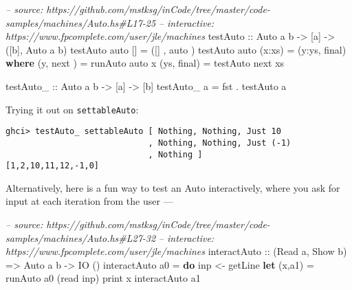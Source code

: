 \documentclass[]{article}
\newenvironment{Shaded}{\begin{snugshade}}{\end{snugshade}}
\newcommand{\CommentTok}[1]{\textcolor[rgb]{0.56,0.35,0.01}{\textit{#1}}}
\newcommand{\DataTypeTok}[1]{\textcolor[rgb]{0.13,0.29,0.53}{#1}}
\newcommand{\FunctionTok}[1]{\textcolor[rgb]{0.00,0.00,0.00}{#1}}
\newcommand{\KeywordTok}[1]{\textcolor[rgb]{0.13,0.29,0.53}{\textbf{#1}}}
\newcommand{\NormalTok}[1]{#1}
\newcommand{\OtherTok}[1]{\textcolor[rgb]{0.56,0.35,0.01}{#1}}
\begin{document}
\begin{Shaded}
\begin{Highlighting}[]
\CommentTok{-- source: https://github.com/mstksg/inCode/tree/master/code-samples/machines/Auto.hs#L17-25}
\CommentTok{-- interactive: https://www.fpcomplete.com/user/jle/machines}
\OtherTok{testAuto ::} \DataTypeTok{Auto}\NormalTok{ a b }\OtherTok{->}\NormalTok{ [a] }\OtherTok{->}\NormalTok{ ([b], }\DataTypeTok{Auto}\NormalTok{ a b)}
\NormalTok{testAuto auto []      }\FunctionTok{=}\NormalTok{ ([]  , auto )}
\NormalTok{testAuto auto (x}\FunctionTok{:}\NormalTok{xs)  }\FunctionTok{=}\NormalTok{ (y}\FunctionTok{:}\NormalTok{ys, final)}
  \KeywordTok{where}
\NormalTok{    (y,  next ) }\FunctionTok{=}\NormalTok{ runAuto  auto x}
\NormalTok{    (ys, final) }\FunctionTok{=}\NormalTok{ testAuto next xs}

\OtherTok{testAuto_ ::} \DataTypeTok{Auto}\NormalTok{ a b }\OtherTok{->}\NormalTok{ [a] }\OtherTok{->}\NormalTok{ [b]}
\NormalTok{testAuto_ a }\FunctionTok{=}\NormalTok{ fst }\FunctionTok{.}\NormalTok{ testAuto a}
\end{Highlighting}
\end{Shaded}

Trying it out on \texttt{settableAuto}:

\begin{verbatim}
ghci> testAuto_ settableAuto [ Nothing, Nothing, Just 10
                             , Nothing, Nothing, Just (-1)
                             , Nothing ]
[1,2,10,11,12,-1,0]
\end{verbatim}

Alternatively, here is a fun way to test an Auto interactively, where you ask
for input at each iteration from the user ---

\begin{Shaded}
\begin{Highlighting}[]
\CommentTok{-- source: https://github.com/mstksg/inCode/tree/master/code-samples/machines/Auto.hs#L27-32}
\CommentTok{-- interactive: https://www.fpcomplete.com/user/jle/machines}
\OtherTok{interactAuto ::}\NormalTok{ (}\DataTypeTok{Read}\NormalTok{ a, }\DataTypeTok{Show}\NormalTok{ b) }\OtherTok{=>} \DataTypeTok{Auto}\NormalTok{ a b }\OtherTok{->} \DataTypeTok{IO}\NormalTok{ ()}
\NormalTok{interactAuto a0 }\FunctionTok{=} \KeywordTok{do}
\NormalTok{    inp }\OtherTok{<-}\NormalTok{ getLine}
    \KeywordTok{let}\NormalTok{ (x,a1) }\FunctionTok{=}\NormalTok{ runAuto a0 (read inp)}
\NormalTok{    print x}
\NormalTok{    interactAuto a1}
\end{Highlighting}
\end{Shaded}
\end{document}
